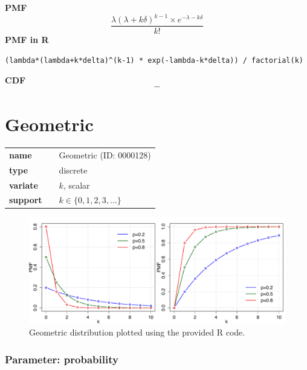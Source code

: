\documentclass{article}
\begin{document}
\smallskip \noindent \hspace{.2cm} \textbf{PMF} 
\begin{equation*}\frac{\lambda (\lambda+k\delta)^{k-1}\times e^{-\lambda - k \delta}}{k!}\end{equation*}
\smallskip \noindent \hspace{.2cm} \textbf{PMF in R}  
\begin{verbatim}(lambda*(lambda+k*delta)^(k-1) * exp(-lambda-k*delta)) / factorial(k)\end{verbatim}
\smallskip \noindent \hspace{.2cm} \textbf{CDF} 
\begin{equation*}-\end{equation*}
\smallskip\section*{Geometric} 

  \bigskip 

\begin{tabular}{p{2cm}cl}
\textbf{name} & & Geometric (ID: 0000128)\\ 
 
\textbf{type} & & discrete \\ 

\textbf{variate} & & $k
$, scalar \\ 

\textbf{support} & & $k \in \{0,1,2,3,\dots\}$
\end{tabular}

\begin{figure}[ht!]
\centering
  \includegraphics[width=140mm]{pics/Geometric.pdf}
 \caption{Geometric distribution plotted using the provided R code.}
 \label{fig:Geometric}
\end{figure}

\subsubsection*{Parameter: probability}
\end{document}
